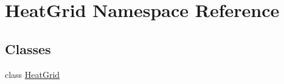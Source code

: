\hypertarget{namespace_heat_grid}{}\section{Heat\+Grid Namespace Reference}
\label{namespace_heat_grid}
\subsection*{Classes}
\begin{DoxyCompactItemize}
\item 
class \hyperlink{class_heat_grid_1_1_heat_grid}{Heat\+Grid}
\end{DoxyCompactItemize}
